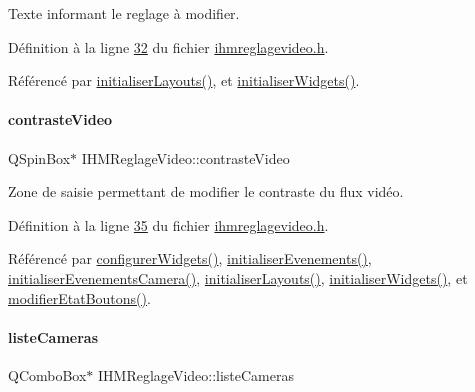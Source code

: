 Texte informant le reglage à modifier. 



Définition à la ligne \hyperlink{ihmreglagevideo_8h_source_l00032}{32} du fichier \hyperlink{ihmreglagevideo_8h_source}{ihmreglagevideo.\+h}.



Référencé par \hyperlink{ihmreglagevideo_8cpp_source_l00061}{initialiser\+Layouts()}, et \hyperlink{ihmreglagevideo_8cpp_source_l00023}{initialiser\+Widgets()}.

\mbox{\label{class_i_h_m_reglage_video_a617e9dbd5a92c35e7e351228354deb63}} 
\paragraph{\texorpdfstring{contraste\+Video}{contrasteVideo}}
{\footnotesize\ttfamily Q\+Spin\+Box$\ast$ I\+H\+M\+Reglage\+Video\+::contraste\+Video\hspace{0.3cm}{\ttfamily [private]}}



Zone de saisie permettant de modifier le contraste du flux vidéo. 



Définition à la ligne \hyperlink{ihmreglagevideo_8h_source_l00035}{35} du fichier \hyperlink{ihmreglagevideo_8h_source}{ihmreglagevideo.\+h}.



Référencé par \hyperlink{ihmreglagevideo_8cpp_source_l00047}{configurer\+Widgets()}, \hyperlink{ihmreglagevideo_8cpp_source_l00105}{initialiser\+Evenements()}, \hyperlink{ihmreglagevideo_8cpp_source_l00117}{initialiser\+Evenements\+Camera()}, \hyperlink{ihmreglagevideo_8cpp_source_l00061}{initialiser\+Layouts()}, \hyperlink{ihmreglagevideo_8cpp_source_l00023}{initialiser\+Widgets()}, et \hyperlink{ihmreglagevideo_8cpp_source_l00212}{modifier\+Etat\+Boutons()}.

\mbox{\label{class_i_h_m_reglage_video_a38a35548ddd0e5750917305ac6f32142}} 
\paragraph{\texorpdfstring{liste\+Cameras}{listeCameras}}
{\footnotesize\ttfamily Q\+Combo\+Box$\ast$ I\+H\+M\+Reglage\+Video\+::liste\+Cameras\hspace{0.3cm}{\ttfamily [private]}}



